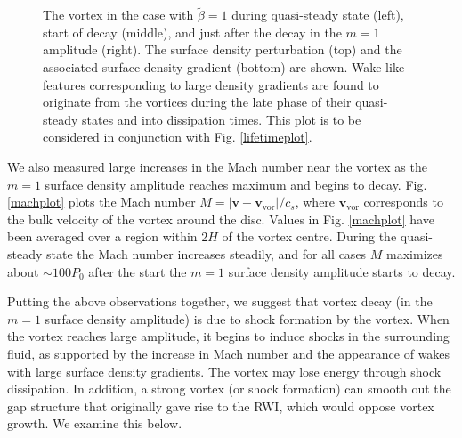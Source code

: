 \begin{figure}
{  }
  \hfill
  \caption{The vortex in the case with $\tilde{\beta}=1$
    during quasi-steady state (left), start of decay 
    (middle), and just after the decay in the $m=1$ amplitude
    (right). The surface density perturbation
    (top) and the associated surface density gradient (bottom) are
    shown. Wake like features corresponding to large density gradients
    are found to originate from the vortices during the late phase of 
    their quasi-steady states and into dissipation times.
    This plot is to be considered in conjunction with
    Fig. \ref{lifetimeplot}. 
    \label{shockplot}}
\end{figure}

We also measured large increases in the Mach number near
the vortex as the $m=1$ surface density amplitude reaches maximum and begins to decay. 
Fig. \ref{machplot} plots the Mach number $M=|\bm{v} -
\bm{v}_\mathrm{vor}|/c_s$, where 
$\bm{v}_\mathrm{vor}$ corresponds to the bulk velocity of the vortex
around the disc. Values in Fig. \ref{machplot} have been averaged over
a region within $2H$ of the vortex centre. 
During the quasi-steady state the Mach number increases 
steadily, and for all cases $M$ maximizes about
$\sim 100P_0$ after the start the $m=1$ surface density
amplitude starts to decay. 

Putting the above observations together, we suggest that vortex decay
(in the $m=1$ surface density amplitude) is due to shock formation by
the vortex. When the vortex reaches large amplitude, it begins
to induce shocks in the surrounding fluid, as supported by the
increase in Mach number and the appearance of wakes with large surface
density gradients. The vortex may lose energy through shock
dissipation. In addition, a strong vortex (or shock formation) 
can smooth out the gap structure that originally gave rise to the
RWI, which would oppose vortex growth. We examine this below.


